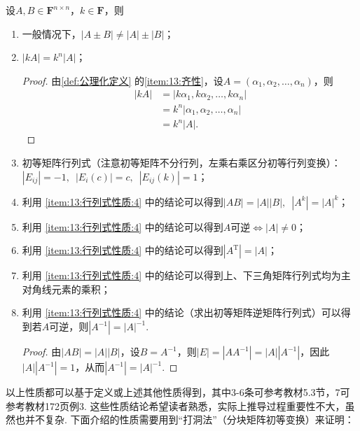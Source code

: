 设$A,B \in \mathbf{F}^{n \times n}$，$k \in \mathbf{F}$，则
\begin{enumerate}
    \item 一般情况下，$|A \pm B| \neq |A|\pm|B|$；

    \item $|kA|=k^n|A|$；
          \begin{proof}
              由\autoref{def:公理化定义} 的\ref*{item:13:齐性}，设$A=(\alpha_1,\alpha_2,\ldots,\alpha_n)$，则
              \begin{align*}
                  |kA| & =|k\alpha_1,k\alpha_2,\ldots,k\alpha_n| \\
                       & =k^n|\alpha_1,\alpha_2,\ldots,\alpha_n| \\
                       & =k^n|A|.
              \end{align*}
          \end{proof}

    \item \label{item:13:行列式性质:4}
          初等矩阵行列式（注意初等矩阵不分行列，左乘右乘区分初等行列变换）：\\
          $|E_{ij}|=-1,\enspace |E_i(c)|=c,\enspace |E_{ij}(k)|=1$；

    \item 利用 \ref*{item:13:行列式性质:4} 中的结论可以得到$|AB|=|A||B|,\enspace|A^k|=|A|^k$；

    \item 利用 \ref*{item:13:行列式性质:4} 中的结论可以得到$A$可逆$\iff |A| \neq 0$；

    \item 利用 \ref*{item:13:行列式性质:4} 中的结论可以得到$|A^\mathrm{T}|=|A|$；

    \item 利用 \ref*{item:13:行列式性质:4} 中的结论可以得到上、下三角矩阵行列式均为主对角线元素的乘积；

    \item 利用 \ref*{item:13:行列式性质:4} 中的结论（求出初等矩阵逆矩阵行列式）可以得到若$A$可逆，则$|A^{-1}|=|A|^{-1}$.
          \begin{proof}
              由$|AB|=|A||B|$，设$B=A^{-1}$，则$|E|=|AA^{-1}|=|A||A^{-1}|$，因此$|A||A^{-1}|=1$，从而$|A^{-1}|=|A|^{-1}$.
          \end{proof}
\end{enumerate}

以上性质都可以基于定义或上述其他性质得到，其中3-6条可参考教材5.3节，7可参考教材172页例3. 这些性质结论希望读者熟悉，实际上推导过程重要性不大，虽然也并不复杂. 下面介绍的性质需要用到``打洞法''（分块矩阵初等变换）来证明：

